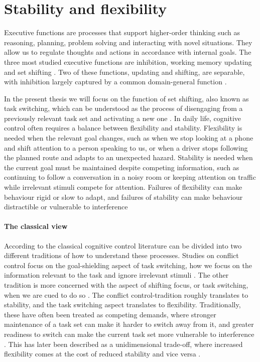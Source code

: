 \documentclass[12pt,a4paper]{report}
\begin{document}
\section{Stability and flexibility}

Executive functions are processes that support higher-order thinking such as reasoning, planning, problem solving and interacting with novel situations. They allow us to regulate thoughts and actions in accordance with internal goals. The three most studied executive functions are inhibition, working memory updating and set shifting \parencite{friedman2017unity,diamond2013executive}. Two of these functions, updating and shifting, are separable, with inhibition largely captured by a common domain-general function \parencite{friedman2017unity}. 

In the present thesis we will focus on the function of set shifting, also known as task switching, which can be understood as the process of disengaging from a previously relevant task set and activating a new one \parencite{rogers1995taskswitch, monsell2003switching, kiesel2010review}. In daily life, cognitive control often requires a balance between flexibility and stability. Flexibility is needed when the relevant goal changes, such as when we stop looking at a phone and shift attention to a person speaking to us, or when a driver stops following the planned route and adapts to an unexpected hazard. Stability is needed when the current goal must be maintained despite competing information, such as continuing to follow a conversation in a noisy room or keeping attention on traffic while irrelevant stimuli compete for attention. Failures of flexibility can make behaviour rigid or slow to adapt, and failures of stability can make behaviour distractible or vulnerable to interference

\paragraph{The classical view} According to \textcite{egner2023principles} the classical cognitive control literature can be divided into two different traditions of how to understand these processes. Studies on conflict control focus on the goal-shielding aspect of task switching, how we focus on the information relevant to the task and ignore irrelevant stimuli \parencite{botvinick2001conflict}. The other tradition is more concerned with the aspect of shifting focus, or task switching, when we are cued to do so \parencite{monsell2003switching}. The conflict control-tradition roughly translates to stability, and the task switching aspect translates to flexibility. Traditionally, these have often been treated as competing demands, where stronger maintenance of a task set can make it harder to switch away from it, and greater readiness to switch can make the current task set more vulnerable to interference \parencite{goschke2000intentional, geddert2022tradeoff}. This has later been described as a unidimensional trade-off, where increased flexibility comes at the cost of reduced stability and vice versa \parencite{geddert2022tradeoff,nack2023metacognition}.
\end{document}
